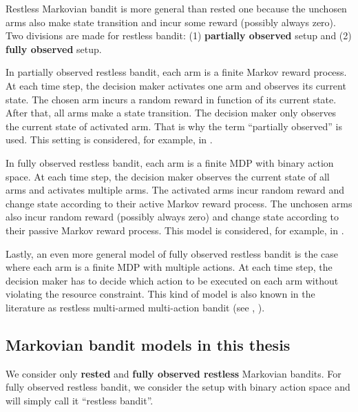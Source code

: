 Restless Markovian bandit is more general than rested one because
the unchosen arms also make state transition and incur some reward (possibly always zero).
Two divisions are made for restless bandit: (1) \textbf{partially observed} setup and (2) \textbf{fully observed} setup.

In partially observed restless bandit, each arm is a finite Markov reward process.
At each time step, the decision maker activates one arm and observes its current state.
The chosen arm incurs a random reward in function of its current state.
After that, all arms make a state transition.
The decision maker only observes the current state of activated arm.
That is why the term ``partially observed'' is used.
This setting is considered, for example, in \cite{ahmad2009multi,ortner2012regret, jung2019regret, akbarzadeh2019dynamic, wang2020restless}.

In fully observed restless bandit, each arm is a finite MDP with binary action space.
At each time step, the decision maker observes the current state of all arms and activates multiple arms.
The activated arms incur random reward and change state according to their active Markov reward process.
The unchosen arms also incur random reward (possibly always zero) and change state according to their passive Markov reward process.
This model is considered, for example, in \cite{whittle1996optimal,akbarzadeh2019restless,gast2020exponential,dahiya2022scalable}.

Lastly, an even more general model of fully observed restless bandit is the case where each arm is a finite MDP with multiple actions.
At each time step, the decision maker has to decide which action to be executed on each arm without violating the resource constraint.
This kind of model is also known in the literature as restless multi-armed multi-action bandit (see \eg, \cite{hodge2015asymptotic,killian2021beyond}).

\subsection*{Markovian bandit models in this thesis}

We consider only \textbf{rested} and \textbf{fully observed restless} Markovian bandits.
For fully observed restless bandit, we consider the setup with binary action space and will simply call it ``restless bandit''.

